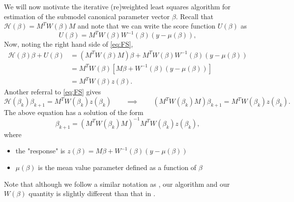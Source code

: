 \documentclass[12pt]{article}
\newcommand{\Hcal}{\mathcal{H}}
\begin{document}
We will now motivate the iterative (re)weighted least squares algorithm for estimation of the submodel canonical parameter vector $\beta$. Recall that $\Hcal(\beta) = M^TW(\beta)M$ and note that we can write the score function $U(\beta)$ as 
$$
  U(\beta) = M^T W(\beta) W^{-1}(\beta)(y - \mu(\beta)), 
$$
Now, noting the right hand side of \eqref{eq:FS},
\begin{align*}
	\Hcal(\beta)\beta + U(\beta) &= (M^TW(\beta)M)\beta + M^TW(\beta) W^{-1}(\beta)(y - \mu(\beta)) \\
	&= M^T W(\beta)\left[M\beta + W^{-1}(\beta)(y - \mu(\beta))\right] \\
	&= M^T W(\beta) z(\beta).
\end{align*}
Another referral to \eqref{eq:FS} gives
$$
  \Hcal(\beta_k)\beta_{k+1} = M^T W(\beta_k) z(\beta_k) 
  \qquad \implies \qquad 
  (M^TW(\beta_k)M)\beta_{k+1} = M^T W(\beta_k) z(\beta_k).
$$
The above equation has a solution of the form
$$
  \beta_{k+1} = (M^TW(\beta_k)M)^{-1}M^T W(\beta_k) z(\beta_k), 
$$
where 
\begin{itemize}
	\item the "response" is $z(\beta) = M\beta + W^{-1}(\beta)(y - \mu(\beta))$
	\item $\mu(\beta)$ is the mean value parameter defined as a function of $\beta$
\end{itemize}
Note that although we follow a similar notation as \cite{agresti2013cat}, our algorithm and our $W(\beta)$ quantity is slightly different than that in \cite{agresti2013cat}.


\end{document}
